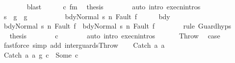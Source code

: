 \begin{isabellebody}
\ \ \ \ \ \ \isamarkupfalse%
\ blast\isanewline
\ \ \ \ \isamarkupfalse%
\ c{}\ f{\isacharunderscore}m\ \isamarkupfalse%
\ {\isacharquery}thesis\isanewline
\ \ \ \ \ \ \isamarkupfalse%
\ {\isacharparenleft}auto\ intro{\isacharcolon}\ execn{\isachardot}intros{\isacharparenright}\isanewline
\ \ \isamarkupfalse%
\isanewline
\ \ \ \ \isamarkupfalse%
\ {\isachardoublequoteopen}s\ {\isasymin}\ g{}\ {\isasyminter}\ g{}{\isachardoublequoteclose}\isanewline
\ \ \ \ \isamarkupfalse%
\isanewline
\ \ \ \ \isamarkupfalse%
\ {\isachardoublequoteopen}{\isasymGamma}{\isasymturnstile}{\isasymlangle}bdy{\isacharcomma}Normal\ s{\isasymrangle}\ {\isacharequal}n{\isasymRightarrow}\ Fault\ f{\isachardoublequoteclose}\isanewline
\ \ \ \ \isamarkupfalse%
\ bdy\ \isamarkupfalse%
\ {\isachardoublequoteopen}{\isasymGamma}{\isasymturnstile}{\isasymlangle}bdy{}{\isacharcomma}Normal\ s{\isasymrangle}\ {\isacharequal}n{\isasymRightarrow}\ Fault\ f\ {\isasymor}\ {\isasymGamma}{\isasymturnstile}{\isasymlangle}bdy{}{\isacharcomma}Normal\ s{\isasymrangle}\ {\isacharequal}n{\isasymRightarrow}\ Fault\ f{\isachardoublequoteclose}\isanewline
\ \ \ \ \ \ \isamarkupfalse%
\ {\isacharparenleft}rule\ Guard{\isachardot}hyps{\isacharparenright}\isanewline
\ \ \ \ \isamarkupfalse%
\ \isamarkupfalse%
\ {\isacharquery}thesis\isanewline
\ \ \ \ \ \ \isamarkupfalse%
\ c{}\isanewline
\ \ \ \ \ \ \isamarkupfalse%
\ {\isacharparenleft}auto\ intro{\isacharcolon}\ execn{\isachardot}intros{\isacharparenright}\isanewline
\ \ \isamarkupfalse%
\isanewline
{}\isamarkupfalse%
\isanewline
\ \ \isamarkupfalse%
\ Throw\ \isamarkupfalse%
\ {\isacharquery}case\ \isamarkupfalse%
\ {\isacharparenleft}fastforce\ simp\ add{\isacharcolon}\ inter{\isacharunderscore}guards{\isacharunderscore}Throw{\isacharparenright}\isanewline
{}\isamarkupfalse%
\isanewline
\ \ \isamarkupfalse%
\ {\isacharparenleft}Catch\ a{}\ a{}{\isacharparenright}\isanewline
\ \ \isamarkupfalse%
\ {\isachardoublequoteopen}{\isacharparenleft}Catch\ a{}\ a{}\ {\isasyminter}\isactrlsub g\ c{}{\isacharparenright}\ {\isacharequal}\ Some\ c{\isachardoublequoteclose}\ \isamarkupfalse%

\end{isabellebody}

